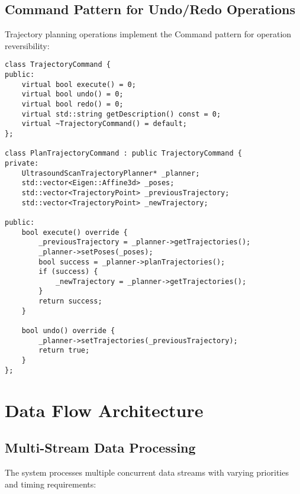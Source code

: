 \subsection{Command Pattern for Undo/Redo Operations}

Trajectory planning operations implement the Command pattern for operation reversibility:

\begin{lstlisting}[caption={Command Pattern for Trajectory Operations}, label={lst:command_pattern}]
class TrajectoryCommand {
public:
    virtual bool execute() = 0;
    virtual bool undo() = 0;
    virtual bool redo() = 0;
    virtual std::string getDescription() const = 0;
    virtual ~TrajectoryCommand() = default;
};

class PlanTrajectoryCommand : public TrajectoryCommand {
private:
    UltrasoundScanTrajectoryPlanner* _planner;
    std::vector<Eigen::Affine3d> _poses;
    std::vector<TrajectoryPoint> _previousTrajectory;
    std::vector<TrajectoryPoint> _newTrajectory;
    
public:
    bool execute() override {
        _previousTrajectory = _planner->getTrajectories();
        _planner->setPoses(_poses);
        bool success = _planner->planTrajectories();
        if (success) {
            _newTrajectory = _planner->getTrajectories();
        }
        return success;
    }
    
    bool undo() override {
        _planner->setTrajectories(_previousTrajectory);
        return true;
    }
};
\end{lstlisting}

\section{Data Flow Architecture}
\label{sec:data_flow}

\subsection{Multi-Stream Data Processing}

The \rus{} system processes multiple concurrent data streams with varying priorities and timing requirements:

